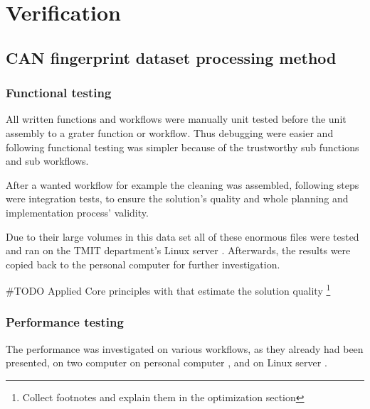 \chapter{Verification}
\section{CAN fingerprint dataset processing method}
\subsection{Functional testing}
All written functions and workflows were manually unit tested before the unit assembly to a grater function or workflow. Thus debugging were easier and following functional testing was simpler because of the trustworthy sub functions and sub workflows.

After a wanted workflow for example the cleaning was assembled, following steps were integration tests, to ensure the solution's quality and whole planning and implementation process' validity.

Due to their large volumes in this data set all of these enormous files were tested and ran on the TMIT department's Linux server \cite{Batman}.
Afterwards, the results were copied back to the personal computer for further investigation.

\#TODO Applied Core principles with that estimate the solution quality
\footnote{Collect footnotes and explain them in the optimization section}
\subsection{Performance testing}
The performance was investigated on various workflows, as they already had been presented, on two computer on personal computer \cite{Latitude}, and on Linux server \cite{Batman}.

